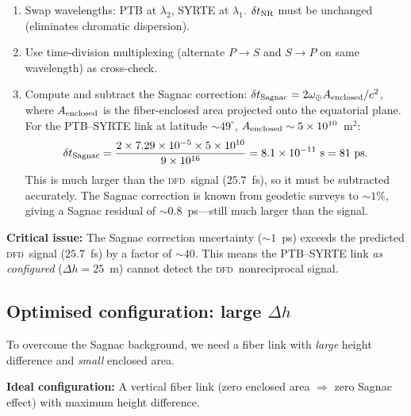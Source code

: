 \documentclass[aps,prl,twocolumn,superscriptaddress,showpacs]{revtex4-2}
\newcommand{\DFD}{\textsc{dfd}}
\begin{document}
\begin{enumerate}
\item Swap wavelengths: PTB at $\lambda_2$, SYRTE at $\lambda_1$.
      $\delta t_{\rm NR}$ must be unchanged (eliminates chromatic
      dispersion).
\item Use time-division multiplexing (alternate $P\to S$ and
      $S\to P$ on same wavelength) as cross-check.
\item Compute and subtract the Sagnac correction:
      $\delta t_{\rm Sagnac} = 2\omega_\oplus A_{\rm enclosed}/c^2$,
      where $A_{\rm enclosed}$ is the fiber-enclosed area projected
      onto the equatorial plane.  For the PTB--SYRTE link at
      latitude $\sim 49^\circ$, $A_{\rm enclosed} \sim 5\times 10^{10}$~m$^2$:
      \begin{equation}
      \delta t_{\rm Sagnac} = \frac{2\times 7.29\times 10^{-5}
      \times 5\times 10^{10}}{9\times 10^{16}}
      = 8.1\times 10^{-11}~\text{s} = 81~\text{ps}.
      \end{equation}
      This is much larger than the \DFD\ signal ($25.7$~fs), so it
      must be subtracted accurately.  The Sagnac correction is known
      from geodetic surveys to $\sim 1\%$, giving a Sagnac residual
      of $\sim 0.8$~ps---still much larger than the signal.
\end{enumerate}

\textbf{Critical issue:} The Sagnac correction uncertainty ($\sim 1$~ps)
exceeds the predicted \DFD\ signal ($25.7$~fs) by a factor of $\sim 40$.
This means the PTB--SYRTE link \emph{as configured} ($\Delta h = 25$~m)
cannot detect the \DFD\ nonreciprocal signal.

\subsection{Optimised configuration: large $\Delta h$}

To overcome the Sagnac background, we need a fiber link with
\emph{large} height difference and \emph{small} enclosed area.

\textbf{Ideal configuration:} A vertical fiber link (zero enclosed
area $\Rightarrow$ zero Sagnac effect) with maximum height difference.
\end{document}
